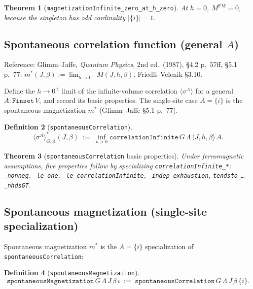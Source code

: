 \documentclass[a4paper,11pt]{article}
\newtheorem{theorem}{Theorem}
\newtheorem{definition}[theorem]{Definition}
\begin{document}
\begin{theorem}[\texttt{magnetizationInfinite\_zero\_at\_h\_zero}]
At $h = 0$, $M^{\mathrm{FM}} = 0$, because the singleton has odd cardinality
$|\{i\}| = 1$.
\end{theorem}

\subsection{Spontaneous correlation function (general \texorpdfstring{$A$}{A})}

Reference: Glimm--Jaffe, \textit{Quantum Physics}, 2nd ed.\ (1987),
\S 4.2 p.\ 57ff, \S 5.1 p.\ 77:
$m^*(J, \beta) := \lim_{h \to 0^+} M(J, h, \beta)$.
Friedli--Velenik \S 3.10.

Define the $h \to 0^+$ limit of the infinite-volume correlation
$\langle \sigma^A \rangle$ for a general $A : \texttt{Finset}\,V$, and record
its basic properties. The single-site case $A = \{i\}$ is the spontaneous
magnetization $m^*$ (Glimm--Jaffe \S 5.1 p.\ 77).

\begin{definition}[\texttt{spontaneousCorrelation}]
\[
\langle \sigma^A \rangle^*_{G, \Lambda}(J, \beta)
  \;:=\; \inf_{h > 0} \texttt{correlationInfinite}\,G\,\Lambda\,\langle J,h,\beta\rangle\,A.
\]
\end{definition}

\begin{theorem}[\texttt{spontaneousCorrelation} basic properties]
Under ferromagnetic assumptions, five properties follow by specializing
\texttt{correlationInfinite\_*}:
\texttt{\_nonneg},
\texttt{\_le\_one},
\texttt{\_le\_correlationInfinite},
\texttt{\_indep\_exhaustion},
\texttt{tendsto\_\ldots\_nhdsGT}.
\end{theorem}

\subsection*{Spontaneous magnetization (single-site specialization)}

Spontaneous magnetization $m^*$ is the $A = \{i\}$ specialization of
\texttt{spontaneousCorrelation}:

\begin{definition}[\texttt{spontaneousMagnetization}]
\[
\texttt{spontaneousMagnetization}\,G\,\Lambda\,J\,\beta\,i
  \;:=\; \texttt{spontaneousCorrelation}\,G\,\Lambda\,J\,\beta\,\{i\}.
\]
\end{definition}
\end{document}

